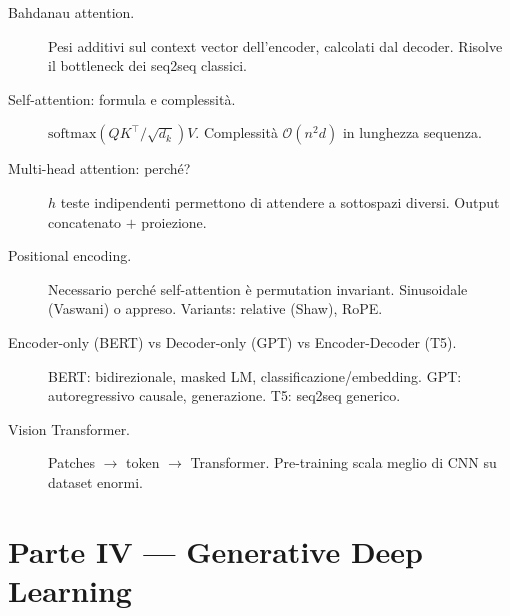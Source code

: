 \begin{description}
  \item[Bahdanau attention.] Pesi additivi sul context vector dell'encoder, calcolati dal decoder. Risolve il bottleneck dei seq2seq classici.
  \item[Self-attention: formula e complessità.] $\mathrm{softmax}(QK^\top/\sqrt{d_k})V$. Complessità $\mathcal{O}(n^2 d)$ in lunghezza sequenza.
  \item[Multi-head attention: perché?] $h$ teste indipendenti permettono di attendere a sottospazi diversi. Output concatenato $+$ proiezione.
  \item[Positional encoding.] Necessario perché self-attention è permutation invariant. Sinusoidale (Vaswani) o appreso. Variants: relative (Shaw), RoPE.
  \item[Encoder-only (BERT) vs Decoder-only (GPT) vs Encoder-Decoder (T5).] BERT: bidirezionale, masked LM, classificazione/embedding. GPT: autoregressivo causale, generazione. T5: seq2seq generico.
  \item[Vision Transformer.] Patches $\to$ token $\to$ Transformer. Pre-training scala meglio di CNN su dataset enormi.
\end{description}

\section{Parte IV — Generative Deep Learning}

